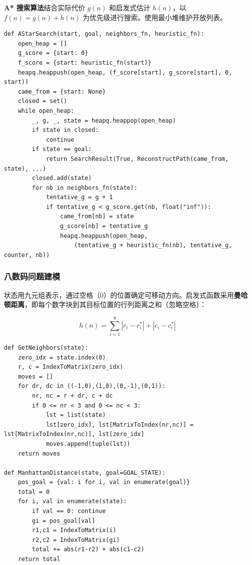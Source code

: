 \documentclass[UTF8]{ctexart}
\begin{document}
\textbf{A* 搜索算法}结合实际代价 $g(n)$ 和启发式估计 $h(n)$，以 $f(n) = g(n) + h(n)$ 为优先级进行搜索。使用最小堆维护开放列表。

\begin{lstlisting}[caption={A* 算法核心逻辑}]
def AStarSearch(start, goal, neighbors_fn, heuristic_fn):
    open_heap = []
    g_score = {start: 0}
    f_score = {start: heuristic_fn(start)}
    heapq.heappush(open_heap, (f_score[start], g_score[start], 0, start))
    came_from = {start: None}
    closed = set()
    while open_heap:
        _, g, _, state = heapq.heappop(open_heap)
        if state in closed:
            continue
        if state == goal:
            return SearchResult(True, ReconstructPath(came_from, state), ...)
        closed.add(state)
        for nb in neighbors_fn(state):
            tentative_g = g + 1
            if tentative_g < g_score.get(nb, float("inf")):
                came_from[nb] = state
                g_score[nb] = tentative_g
                heapq.heappush(open_heap,
                    (tentative_g + heuristic_fn(nb), tentative_g, counter, nb))
\end{lstlisting}

\subsubsection{八数码问题建模}

状态用九元组表示，通过空格（$0$）的位置确定可移动方向。启发式函数采用\textbf{曼哈顿距离}，即每个数字块到其目标位置的行列距离之和（忽略空格）：

\[
h(n) = \sum_{i=1}^{8} |r_i - r_i^{*}| + |c_i - c_i^{*}|
\]

\begin{lstlisting}[caption={八数码问题邻居生成与启发式函数}]
def GetNeighbors(state):
    zero_idx = state.index(0)
    r, c = IndexToMatrix(zero_idx)
    moves = []
    for dr, dc in ((-1,0),(1,0),(0,-1),(0,1)):
        nr, nc = r + dr, c + dc
        if 0 <= nr < 3 and 0 <= nc < 3:
            lst = list(state)
            lst[zero_idx], lst[MatrixToIndex(nr,nc)] = lst[MatrixToIndex(nr,nc)], lst[zero_idx]
            moves.append(tuple(lst))
    return moves

def ManhattanDistance(state, goal=GOAL_STATE):
    pos_goal = {val: i for i, val in enumerate(goal)}
    total = 0
    for i, val in enumerate(state):
        if val == 0: continue
        gi = pos_goal[val]
        r1,c1 = IndexToMatrix(i)
        r2,c2 = IndexToMatrix(gi)
        total += abs(r1-r2) + abs(c1-c2)
    return total
\end{lstlisting}
\end{document}
